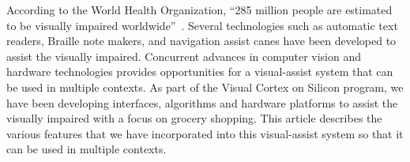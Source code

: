 According to the World Health Organization, ``285 million people are estimated
to be visually impaired worldwide''~\cite{WHO}.
Several technologies such as automatic text readers, 
Braille note makers, and navigation assist canes have been developed to assist the
visually impaired. 
Concurrent advances in computer vision and hardware
technologies provides opportunities for a visual-assist system that
can be used in multiple contexts.
As part of the Visual Cortex on Silicon program, we have been
developing interfaces, algorithms and hardware platforms to assist the
visually impaired with a focus on grocery shopping. This article describes
the various features that we have incorporated 
into this visual-assist system so that it can be used in multiple contexts.
